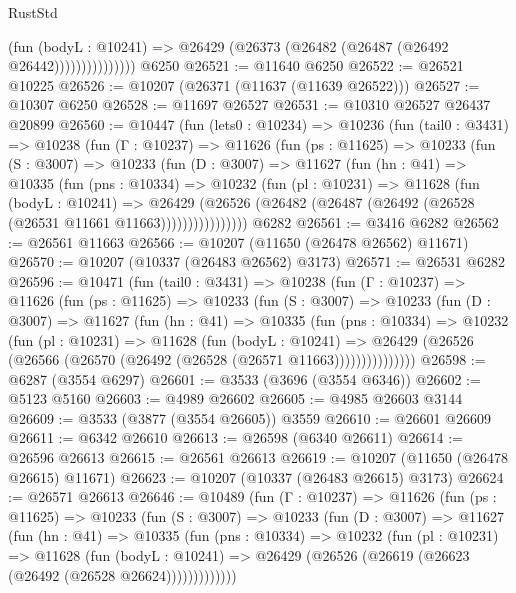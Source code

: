 \begin{lexlean}{RustStd}
\begin{coremodule}
                        (fun (bodyL : @10241) =>
                        @26429 (@26373 (@26482 (@26487 (@26492 @26442)))))))))))))))
    @6250
@26521 := @11640 @6250
@26522 := @26521 @10225
@26526 := @10207 (@26371 (@11637 (@11639 @26522)))
@26527 := @10307 @6250
@26528 := @11697 @26527
@26531 := @10310 @26527 @26437 @20899
@26560 := @10447
    (fun (lets0 : @10234) =>
    @10236
      (fun (tail0 : @3431) =>
      @10238
        (fun (Γ : @10237) =>
        @11626
          (fun (ps : @11625) =>
          @10233
            (fun (S : @3007) =>
            @10233
              (fun (D : @3007) =>
              @11627
                (fun (hn : @41) =>
                @10335
                  (fun (pns : @10334) =>
                  @10232
                    (fun (pl : @10231) =>
                    @11628
                      (fun (bodyL : @10241) =>
                      @26429
                        (@26526
                          (@26482 (@26487 (@26492 (@26528 (@26531 @11661 @11663))))))))))))))))
    @6282
@26561 := @3416 @6282
@26562 := @26561 @11663
@26566 := @10207 (@11650 (@26478 @26562) @11671)
@26570 := @10207 (@10337 (@26483 @26562) @3173)
@26571 := @26531 @6282
@26596 := @10471
    (fun (tail0 : @3431) =>
    @10238
      (fun (Γ : @10237) =>
      @11626
        (fun (ps : @11625) =>
        @10233
          (fun (S : @3007) =>
          @10233
            (fun (D : @3007) =>
            @11627
              (fun (hn : @41) =>
              @10335
                (fun (pns : @10334) =>
                @10232
                  (fun (pl : @10231) =>
                  @11628
                    (fun (bodyL : @10241) =>
                    @26429 (@26526 (@26566 (@26570 (@26492 (@26528 (@26571 @11663)))))))))))))))
@26598 := @6287 (@3554 @6297)
@26601 := @3533 (@3696 (@3554 @6346))
@26602 := @5123 @5160
@26603 := @4989 @26602
@26605 := @4985 @26603 @3144
@26609 := @3533 (@3877 (@3554 @26605)) @3559
@26610 := @26601 @26609
@26611 := @6342 @26610
@26613 := @26598 (@6340 @26611)
@26614 := @26596 @26613
@26615 := @26561 @26613
@26619 := @10207 (@11650 (@26478 @26615) @11671)
@26623 := @10207 (@10337 (@26483 @26615) @3173)
@26624 := @26571 @26613
@26646 := @10489
    (fun (Γ : @10237) =>
    @11626
      (fun (ps : @11625) =>
      @10233
        (fun (S : @3007) =>
        @10233
          (fun (D : @3007) =>
          @11627
            (fun (hn : @41) =>
            @10335
              (fun (pns : @10334) =>
              @10232
                (fun (pl : @10231) =>
                @11628
                  (fun (bodyL : @10241) =>
                  @26429 (@26526 (@26619 (@26623 (@26492 (@26528 @26624)))))))))))))

\end{coremodule}
\end{lexlean}
